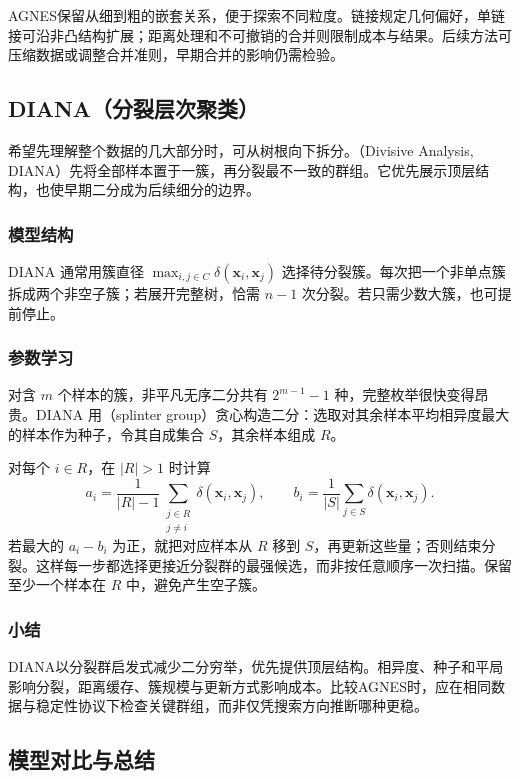AGNES保留从细到粗的嵌套关系，便于探索不同粒度。链接规定几何偏好，单链接可沿非凸结构扩展；距离处理和不可撤销的合并则限制成本与结果。后续方法可压缩数据或调整合并准则，早期合并的影响仍需检验。

\subsection{DIANA（分裂层次聚类）}

希望先理解整个数据的几大部分时，可从树根向下拆分。（Divisive Analysis, DIANA）先将全部样本置于一簇，再分裂最不一致的群组。它优先展示顶层结构，也使早期二分成为后续细分的边界。

\subsubsection{模型结构}

DIANA 通常用簇直径 $\max_{i,j\in C}\delta(\bm{x}_i,\bm{x}_j)$ 选择待分裂簇。每次把一个非单点簇拆成两个非空子簇；若展开完整树，恰需 $n-1$ 次分裂。若只需少数大簇，也可提前停止。

\subsubsection{参数学习}

对含 $m$ 个样本的簇，非平凡无序二分共有 $2^{m-1}-1$ 种，完整枚举很快变得昂贵。DIANA 用（splinter group）贪心构造二分：选取对其余样本平均相异度最大的样本作为种子，令其自成集合 $S$，其余样本组成 $R$。

对每个 $i\in R$，在 $|R|>1$ 时计算
\[
 a_i=\frac{1}{|R|-1}\sum_{\substack{j\in R\\j\ne i}}
 \delta(\bm{x}_i,\bm{x}_j),\qquad
 b_i=\frac{1}{|S|}\sum_{j\in S}\delta(\bm{x}_i,\bm{x}_j).
\]
若最大的 $a_i-b_i$ 为正，就把对应样本从 $R$ 移到 $S$，再更新这些量；否则结束分裂。这样每一步都选择更接近分裂群的最强候选，而非按任意顺序一次扫描。保留至少一个样本在 $R$ 中，避免产生空子簇。

\subsubsection{小结}

DIANA以分裂群启发式减少二分穷举，优先提供顶层结构。相异度、种子和平局影响分裂，距离缓存、簇规模与更新方式影响成本。比较AGNES时，应在相同数据与稳定性协议下检查关键群组，而非仅凭搜索方向推断哪种更稳。

\subsection{模型对比与总结}

